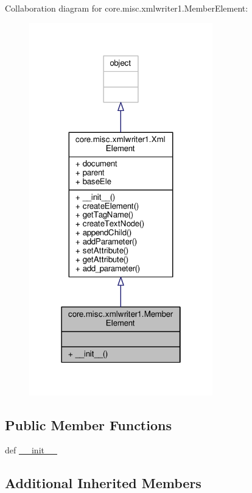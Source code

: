 Collaboration diagram for core.\+misc.\+xmlwriter1.\+Member\+Element\+:
\nopagebreak
\begin{figure}[H]
\begin{center}
\leavevmode
\includegraphics[width=226pt]{classcore_1_1misc_1_1xmlwriter1_1_1_member_element__coll__graph}
\end{center}
\end{figure}
\subsection*{Public Member Functions}
\begin{DoxyCompactItemize}
\item 
def \hyperlink{classcore_1_1misc_1_1xmlwriter1_1_1_member_element_a19bd960db707a39fc291734b1455e7c9}{\+\_\+\+\_\+init\+\_\+\+\_\+}
\end{DoxyCompactItemize}
\subsection*{Additional Inherited Members}


